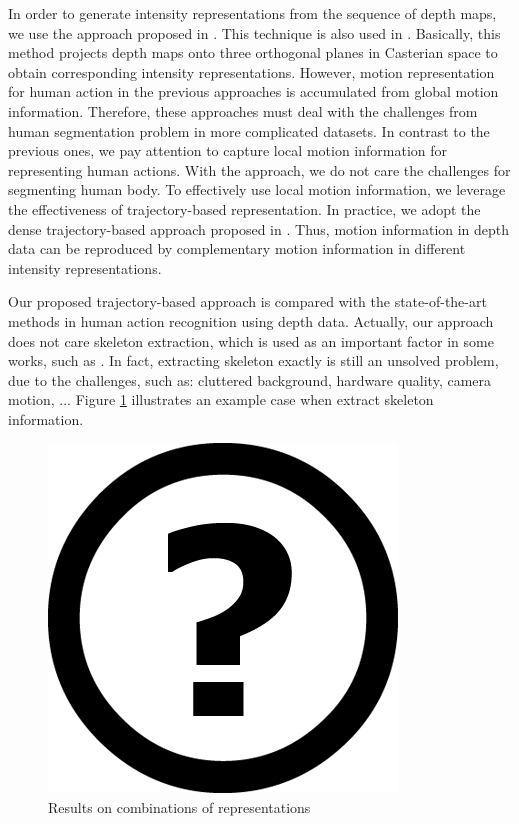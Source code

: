 \documentclass[review]{elsarticle}
\begin{document}
In order to generate intensity representations from the sequence of depth maps, we use the approach proposed in \cite{li2010action}. This technique is also used in \cite{yang2012recognizing}. Basically, this method projects depth maps onto three orthogonal planes in Casterian space to obtain corresponding intensity representations. However, motion representation for human action in the previous approaches is accumulated from global motion information. Therefore, these approaches must deal with the challenges from human segmentation problem in more complicated datasets. In contrast to the previous ones, we pay attention to capture local motion information for representing human actions. With the approach, we do not care the challenges for segmenting human body. To effectively use local motion information, we leverage the effectiveness of trajectory-based representation. In practice, we adopt the dense trajectory-based approach proposed in \cite{wang2011densetraj}. Thus, motion information in depth data can be reproduced by complementary motion information in different intensity representations.

Our proposed trajectory-based approach is compared with the state-of-the-art methods in human action recognition using depth data. Actually, our approach does not care skeleton extraction, which is used as an important factor in some works, such as \cite{wang2012mining, yang2012eigenjoints}. In fact, extracting skeleton exactly is still an unsolved problem, due to the challenges, such as: cluttered background, hardware quality, camera motion, ... Figure \ref{lbl:Figure_SkeletonError} illustrates an example case when extract skeleton information.

\begin{figure}[H]
	\begin{center}
		\includegraphics[scale=0.5]{Unknown.png}
	\end{center}
	\caption{\label{lbl:Figure_SkeletonError}Results on combinations of representations}
\end{figure}
\end{document}
